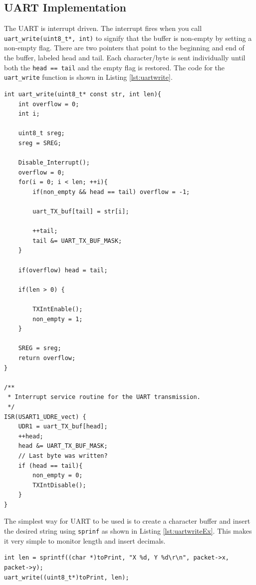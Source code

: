 \subsection{UART Implementation}
The UART is interrupt driven. The interrupt fires when you call
\texttt{uart\_write(uint8\_t*, int)} to signify that the buffer is non-empty by
setting a non-empty flag. There are two pointers that point to the beginning and
end of the buffer, labeled head and tail. Each character/byte is sent individually until
both the \texttt{head == tail} and the empty flag is restored. The code for the
\texttt{uart\_write} function is shown in Listing \ref{lst:uartwrite}.

\begin{lstlisting}[label={lst:uartwrite},
                   caption={UART write function and ISR}]
int uart_write(uint8_t* const str, int len){
    int overflow = 0;
    int i;

    uint8_t sreg;
    sreg = SREG;

    Disable_Interrupt();
    overflow = 0;
    for(i = 0; i < len; ++i){  
        if(non_empty && head == tail) overflow = -1;

        uart_TX_buf[tail] = str[i];

        ++tail;
        tail &= UART_TX_BUF_MASK;
    }
    
    if(overflow) head = tail;     

    if(len > 0) {

        TXIntEnable();
        non_empty = 1;
    }

    SREG = sreg;
    return overflow; 
}

/**
 * Interrupt service routine for the UART transmission.
 */
ISR(USART1_UDRE_vect) {
    UDR1 = uart_TX_buf[head];
    ++head;
    head &= UART_TX_BUF_MASK;
    // Last byte was written?
    if (head == tail){
        non_empty = 0;
        TXIntDisable();
    }
}
\end{lstlisting}

The simplest way for UART to be used is to create a character buffer and insert
the desired string using \texttt{sprinf} as shown in Listing
\ref{lst:uartwriteEx}. This makes it very simple to monitor length and insert
decimals. 

\begin{lstlisting}[float=ht,
                   caption={An example usage of \texttt{uart\_write} function},
                   label={lst:uartwriteEx}]
int len = sprintf((char *)toPrint, "X %d, Y %d\r\n", packet->x, packet->y);
uart_write((uint8_t*)toPrint, len);
\end{lstlisting}

